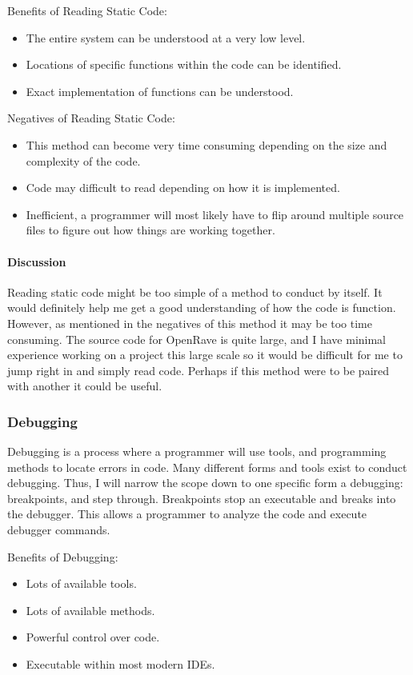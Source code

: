 \documentclass[10pt,journal,compsoc,draftclsnofoot]{IEEEtran}
\begin{document}
Benefits of Reading Static Code:
\begin{itemize}
\item The entire system can be understood at a very low level.
\item Locations of specific functions within the code can be identified.
\item Exact implementation of functions can be understood.
\end{itemize}

Negatives of Reading Static Code:
\begin{itemize}
\item This method can become very time consuming depending on the size and complexity of the code.
\item Code may difficult to read depending on how it is implemented.
\item Inefficient, a programmer will most likely have to flip around multiple source files to figure out how things are working together.
\end{itemize}

\paragraph{Discussion}
Reading static code might be too simple of a method to conduct by itself.
It would definitely help me get a good understanding of how the code is function.
However, as mentioned in the negatives of this method it may be too time consuming.
The source code for OpenRave is quite large, and I have minimal experience working on a project this large scale so it would be difficult for me to jump right in and simply read code.
Perhaps if this method were to be paired with another it could be useful.

\subsubsection{Debugging}
Debugging is a process where a programmer will use tools, and programming methods to locate errors in code.
Many different forms and tools exist to conduct debugging.\cite{debugging}
Thus, I will narrow the scope down to one specific form a debugging: breakpoints, and step through.
Breakpoints stop an executable and breaks into the debugger.
This allows a programmer to analyze the code and execute debugger commands.\cite{debugging}

Benefits of Debugging:
\begin{itemize}
\item Lots of available tools.
\item Lots of available methods.
\item Powerful control over code.
\item Executable within most modern IDEs.
\end{itemize}
\end{document}
